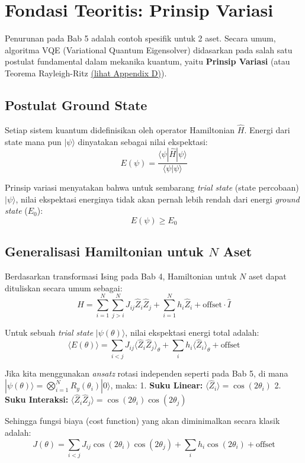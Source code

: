 \hypertarget{fondasi-teoritis-prinsip-variasi}{%
\section{Fondasi Teoritis: Prinsip Variasi}\label{fondasi-teoritis-prinsip-variasi}}

Penurunan pada Bab 5 adalah contoh spesifik untuk 2 aset. Secara umum, algoritma VQE (Variational Quantum Eigensolver) didasarkan pada salah satu postulat fundamental dalam mekanika kuantum, yaitu \textbf{Prinsip Variasi} (atau Teorema Rayleigh-Ritz \hyperref[appendix-d]{(lihat Appendix D)}).

\hypertarget{a.-postulat-ground-state}{%
\subsection{Postulat Ground State}\label{a.-postulat-ground-state}}

Setiap sistem kuantum didefinisikan oleh operator Hamiltonian \(\hat{H}\). Energi dari state mana pun \(|\psi\rangle\) dinyatakan sebagai nilai ekspektasi: \[ E(\psi) = \frac{\langle \psi | \hat{H} | \psi \rangle}{\langle \psi | \psi \rangle} \]

Prinsip variasi menyatakan bahwa untuk sembarang \emph{trial state} (state percobaan) \(|\psi\rangle\), nilai ekspektasi energinya tidak akan pernah lebih rendah dari energi \emph{ground state} (\(E_0\)): \[ E(\psi) \ge E_0 \]

\hypertarget{b.-generalisasi-hamiltonian-untuk-n-aset}{%
\subsection{\texorpdfstring{Generalisasi Hamiltonian untuk \(N\) Aset}{Generalisasi Hamiltonian untuk N Aset}}\label{b.-generalisasi-hamiltonian-untuk-n-aset}}

Berdasarkan transformasi Ising pada Bab 4, Hamiltonian untuk \(N\) aset dapat dituliskan secara umum sebagai: \[ \hat{H} = \sum_{i=1}^N \sum_{j>i}^N J_{ij} \hat{Z}_i \hat{Z}_j + \sum_{i=1}^N h_i \hat{Z}_i + \text{offset} \cdot \hat{I} \]

Untuk sebuah \emph{trial state} \(|\psi(\theta)\rangle\), nilai ekspektasi energi total adalah: \[ \langle E(\theta) \rangle = \sum_{i<j} J_{ij} \langle \hat{Z}_i \hat{Z}_j \rangle_{\theta} + \sum_i h_i \langle \hat{Z}_i \rangle_{\theta} + \text{offset} \]

Jika kita menggunakan \emph{ansatz} rotasi independen seperti pada Bab 5, di mana \(|\psi(\theta)\rangle = \bigotimes_{i=1}^N R_y(\theta_i)|0\rangle\), maka: 1. \textbf{Suku Linear:} \(\langle \hat{Z}_i \rangle = \cos(2\theta_i)\) 2. \textbf{Suku Interaksi:} \(\langle \hat{Z}_i \hat{Z}_j \rangle = \cos(2\theta_i)\cos(2\theta_j)\)

Sehingga fungsi biaya (cost function) yang akan diminimalkan secara klasik adalah: \[ J(\theta) = \sum_{i<j} J_{ij} \cos(2\theta_i)\cos(2\theta_j) + \sum_i h_i \cos(2\theta_i) + \text{offset} \]


